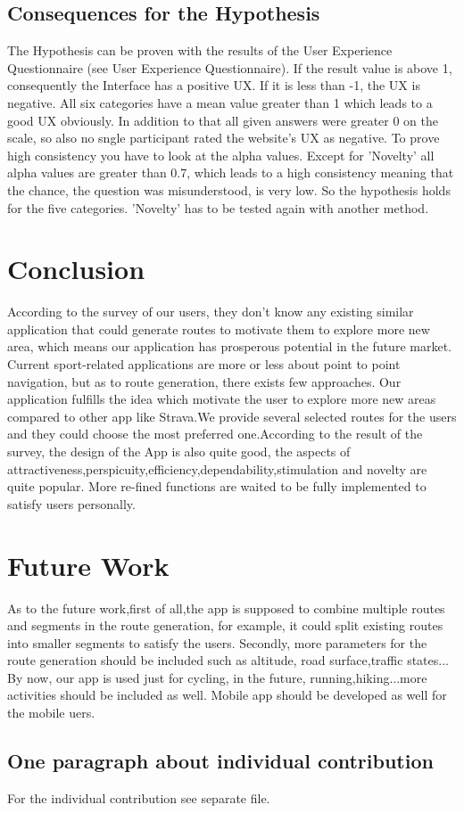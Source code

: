 \documentclass{sigchi}
\begin{document}
\subsection{Consequences for the Hypothesis}
The Hypothesis can be proven with the results of the User Experience Questionnaire (see User Experience Questionnaire). If the result value is above 1, consequently the Interface has a positive UX. If it is less than -1, the UX is negative. All six categories have a mean value greater than 1 which leads to a good UX obviously. In addition to that all given answers were greater 0 on the scale, so also no sngle participant rated the website's UX as negative. To prove high consistency you have to look at the alpha values. Except for 'Novelty' all alpha values are greater than 0.7, which leads to a high consistency meaning that the chance, the question was misunderstood, is very low. So the hypothesis holds for the five categories. 'Novelty' has to be tested again with another method. 

\section{Conclusion}
According to the survey of our users, they don't know any existing similar application that could generate routes to motivate them to explore more new area, which means our application has prosperous potential in the future market.
Current sport-related applications are more or less about point to point navigation, but as to route generation, there exists few approaches.
Our application fulfills the idea which motivate the user to explore more new areas compared to other app like Strava.We provide several selected routes for the users and they could choose the most preferred one.According to the result of the survey, the design of the App is also quite good, the aspects of  attractiveness,perspicuity,efficiency,dependability,stimulation and novelty are quite popular. More re-fined functions are waited to be fully implemented to satisfy users personally.

\section{Future Work}
As to the future work,first of all,the app is supposed to combine multiple routes and segments in the route generation, for example, it could split existing routes into smaller segments to satisfy the users.
Secondly, more parameters for the route generation should be included such as 
altitude, road surface,traffic states...
By now, our app is used just for cycling, in the future, running,hiking...more activities should be included as well.
Mobile app should be developed as well for the mobile uers.

\subsection{One paragraph about individual
contribution}
For the individual contribution see separate file. 

\balance{}



\end{document}
